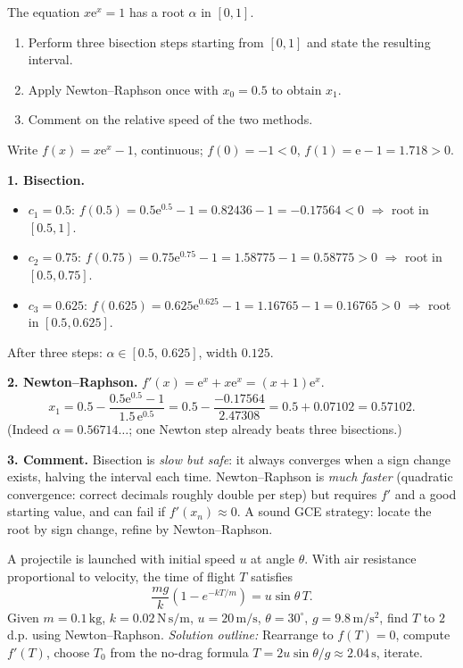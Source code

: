 \documentclass[11pt]{article}
\newcounter{popsec}
\newcounter{popsub}
\newcommand{\courssub}[1]{%
  \stepcounter{popsub}%
  \par\vspace{9pt}\noindent{\popxbold\fontsize{11.5}{13}\selectfont\color{popink}{\color{poporange}\thepopsec.\thepopsub}\hspace{6pt}#1}\par\nopagebreak\vspace{4pt}
}
\begin{document}
\begin{exoresolu}
The equation $x\mathrm{e}^{x}=1$ has a root $\alpha$ in $[0,1]$.
\begin{enumerate}
\item Perform three bisection steps starting from $[0,1]$ and state the resulting interval.
\item Apply Newton--Raphson once with $x_0=0.5$ to obtain $x_1$.
\item Comment on the relative speed of the two methods.
\end{enumerate}
\tcblower
Write $f(x)=x\mathrm{e}^{x}-1$, continuous; $f(0)=-1<0$, $f(1)=\mathrm{e}-1=1.718>0$.

\textbf{1. Bisection.}
\begin{itemize}
\item $c_1=0.5$: $f(0.5)=0.5\mathrm{e}^{0.5}-1=0.82436-1=-0.17564<0$ $\Rightarrow$ root in $[0.5,1]$.
\item $c_2=0.75$: $f(0.75)=0.75\mathrm{e}^{0.75}-1=1.58775-1=0.58775>0$ $\Rightarrow$ root in $[0.5,0.75]$.
\item $c_3=0.625$: $f(0.625)=0.625\mathrm{e}^{0.625}-1=1.16765-1=0.16765>0$ $\Rightarrow$ root in $[0.5,0.625]$.
\end{itemize}
After three steps: $\alpha\in[0.5,\,0.625]$, width $0.125$.

\textbf{2. Newton--Raphson.} $f'(x)=\mathrm{e}^{x}+x\mathrm{e}^{x}=(x+1)\mathrm{e}^{x}$.
\[ x_1=0.5-\frac{0.5\mathrm{e}^{0.5}-1}{1.5\,\mathrm{e}^{0.5}}=0.5-\frac{-0.17564}{2.47308}=0.5+0.07102=0.57102. \]
(Indeed $\alpha=0.56714\ldots$; one Newton step already beats three bisections.)

\textbf{3. Comment.} Bisection is \emph{slow but safe}: it always converges when a sign change exists, halving the interval each time. Newton--Raphson is \emph{much faster} (quadratic convergence: correct decimals roughly double per step) but requires $f'$ and a good starting value, and can fail if $f'(x_n)\approx0$. A sound GCE strategy: locate the root by sign change, refine by Newton--Raphson.
\end{exoresolu}

\courssub{Applications}

\begin{experience}
A projectile is launched with initial speed $u$ at angle $\theta$. With air resistance proportional to velocity, the time of flight $T$ satisfies
\[ \frac{mg}{k}\left(1-e^{-kT/m}\right) = u\sin\theta\, T. \]
Given $m=0.1\,\mathrm{kg}$, $k=0.02\,\mathrm{N\,s/m}$, $u=20\,\mathrm{m/s}$, $\theta=30^\circ$, $g=9.8\,\mathrm{m/s^2}$, find $T$ to $2$ d.p. using Newton--Raphson.
\textit{Solution outline:} Rearrange to $f(T)=0$, compute $f'(T)$, choose $T_0$ from the no-drag formula $T=2u\sin\theta/g\approx2.04\,\mathrm{s}$, iterate.
\end{experience}
\end{document}
